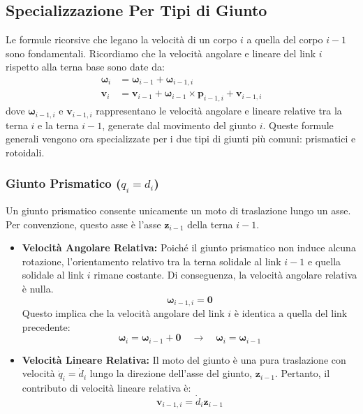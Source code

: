 \documentclass[11pt, a4paper]{report}
\begin{document}
\newpage
\subsection{Specializzazione Per Tipi di Giunto}
Le formule ricorsive che legano la velocità di un corpo \(i\) a quella del corpo \(i-1\) sono fondamentali. Ricordiamo che la velocità angolare e lineare del link \(i\) rispetto alla terna base sono date da:
\begin{align*}
    \bm{\omega}_i &= \bm{\omega}_{i-1} + \bm{\omega}_{i-1,i} \\
    \bm{v}_i &= \bm{v}_{i-1} + \bm{\omega}_{i-1} \times \bm{p}_{i-1,i} + \bm{v}_{i-1,i}
\end{align*}
dove \(\bm{\omega}_{i-1,i}\) e \(\bm{v}_{i-1,i}\) rappresentano le velocità angolare e lineare relative tra la terna \(i\) e la terna \(i-1\), generate dal movimento del giunto \(i\). Queste formule generali vengono ora specializzate per i due tipi di giunti più comuni: prismatici e rotoidali.

\subsubsection{Giunto Prismatico (\texorpdfstring{$q_i = d_i$}{qi = di})}
Un giunto prismatico consente unicamente un moto di traslazione lungo un asse. Per convenzione, questo asse è l'asse \(\bm{z}_{i-1}\) della terna \(i-1\).

\begin{itemize}
    \item \textbf{Velocità Angolare Relativa:} Poiché il giunto prismatico non induce alcuna rotazione, l'orientamento relativo tra la terna solidale al link \(i-1\) e quella solidale al link \(i\) rimane costante. Di conseguenza, la velocità angolare relativa è nulla.
    \[
        \bm{\omega}_{i-1,i} = \bm{0}
    \]
    Questo implica che la velocità angolare del link \(i\) è identica a quella del link precedente:
    \[
        \bm{\omega}_i = \bm{\omega}_{i-1} + \bm{0} \quad \longrightarrow \quad \bm{\omega}_i = \bm{\omega}_{i-1}
    \]

    \item \textbf{Velocità Lineare Relativa:} Il moto del giunto è una pura traslazione con velocità \(\dot{q}_i = \dot{d}_i\) lungo la direzione dell'asse del giunto, \(\bm{z}_{i-1}\). Pertanto, il contributo di velocità lineare relativa è:
    \[
        \bm{v}_{i-1,i} = \dot{d}_i \bm{z}_{i-1}
    \]
\end{itemize}
\end{document}
